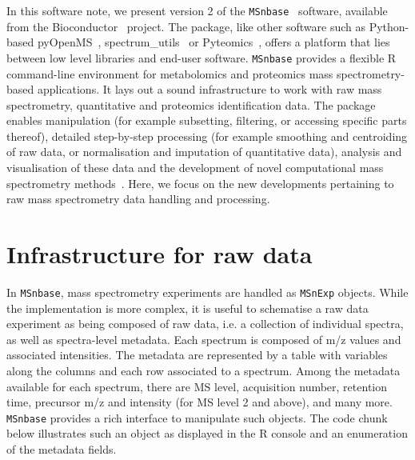 \documentclass[journal=jacsat,manuscript=article]{achemso}\usepackage[]{graphicx}\usepackage[]{color}
\begin{document}
In this software note, we present version 2 of the
\texttt{MSnbase}~\cite{Gatto:2012} software, available from the
Bioconductor~\cite{Huber:2015} project. The package, like other
software such as Python-based {pyOpenMS}~\cite{Rost:2014},
spectrum\_utils~\cite{Bittremieux:2020} or
Pyteomics~\cite{Goloborodko:2013}, offers a platform that lies between
low level libraries and end-user software. \texttt{MSnbase} provides a
flexible R~\cite{R} command-line environment for metabolomics and
proteomics mass spectrometry-based applications. It lays out a sound
infrastructure to work with raw mass spectrometry, quantitative and
proteomics identification data. The package enables manipulation (for
example subsetting, filtering, or accessing specific parts thereof),
detailed step-by-step processing (for example smoothing and
centroiding of raw data, or normalisation and imputation of
quantitative data), analysis and visualisation of these data and the
development of novel computational mass spectrometry
methods~\cite{Stanstrup:2019}. Here, we focus on the new developments
pertaining to raw mass spectrometry data handling and processing.

\section{Infrastructure for raw data}

In \texttt{MSnbase}, mass spectrometry experiments are handled as
\texttt{MSnExp} objects. While the implementation is more complex, it
is useful to schematise a raw data experiment as being composed of raw
data, i.e. a collection of individual spectra, as well as
spectra-level metadata. Each spectrum is composed of m/z values and
associated intensities. The metadata are represented by a table with
variables along the columns and each row associated to a
spectrum. Among the metadata available for each spectrum, there are MS
level, acquisition number, retention time, precursor m/z and intensity
(for MS level 2 and above), and many more. \texttt{MSnbase} provides a
rich interface to manipulate such objects. The code chunk below
illustrates such an object as displayed in the R console and an
enumeration of the metadata fields.
\end{document}
